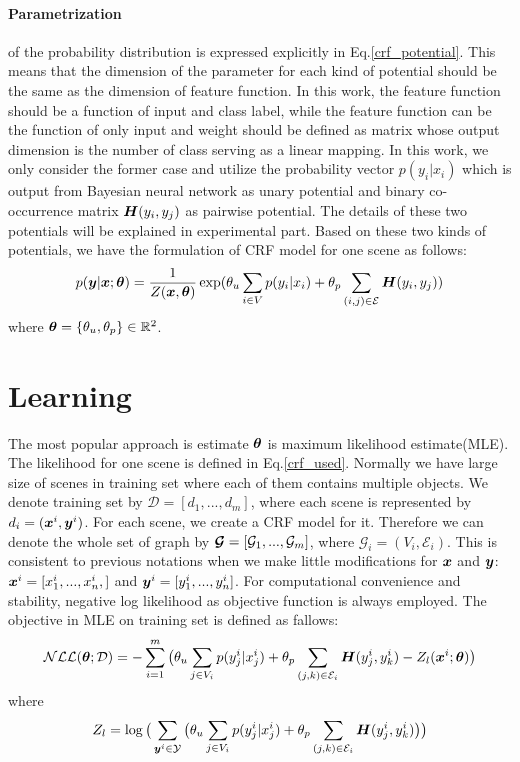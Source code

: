 \paragraph{Parametrization} of the probability distribution is expressed explicitly in Eq.\ref{crf_potential}. This means that the dimension of the parameter for each kind of potential should be the same as the dimension of feature function. In this work, the feature function should be a function of input and class label, while the feature function can be the function of only input and weight should be defined as matrix whose output dimension is the number of class serving as a linear mapping. In this work, we only consider the former case and utilize the probability vector $p(y_i|x_i)$ which is output from Bayesian neural network as unary potential and binary co-occurrence matrix $\boldsymbol H(y_i,y_j)$ as pairwise potential. The details of these two potentials will be explained in experimental part. Based on these two kinds of potentials, we have the formulation of CRF model for one scene as follows:
\begin{equation}
\label{crf_used}
p(\boldsymbol y|\boldsymbol x; \boldsymbol \theta) = \frac{1}{Z(\boldsymbol x, \boldsymbol \theta)}\exp(\theta_u\sum_{i\in V}p(y_i|x_i) + \theta_p\sum_{(i,j)\in \mathcal{E}}\boldsymbol H(y_i,y_j))
\end{equation}
where $\boldsymbol \theta = \{\theta_u, \theta_p\} \in \mathbb{R}^2$.

\section{Learning}
The most popular approach is estimate $\boldsymbol \theta$ is maximum likelihood estimate(MLE). The likelihood for one scene is defined in Eq.\ref{crf_used}. Normally we have large size of scenes in training set where each of them contains multiple objects. We denote training set by $\mathcal{D} = [d_1, ..., d_m]$, where each scene is represented by $d_i = (\boldsymbol x^i, \boldsymbol y^i)$. For each scene, we create a CRF model for it. Therefore we can denote the whole set of graph by $\boldsymbol{\mathcal{G}}=[\mathcal{G}_1, ..., \mathcal{G}_m]$, where $\mathcal{G}_i = (V_i, \mathcal{E}_i)$. This is consistent to previous notations when we make little modifications for $\boldsymbol x$ and $\boldsymbol y$: $\boldsymbol x^i = [x^i_1, ..., x^i_n,]$ and $\boldsymbol y^i = [y^i_1, ..., y^i_n]$. For computational convenience and stability, negative log likelihood as objective function is always employed. The objective in MLE on training set is defined as fallows:
\begin{equation}
\label{crf_obj}
\mathcal{NLL}(\boldsymbol \theta; \mathcal{D}) = -\sum_{i=1}^{m}\big(\theta_u\sum_{j\in V_i} p(y_j^i|x_j^i) + \theta_p\sum_{(j,k)\in\mathcal{E}_i}\boldsymbol H(y_j^i, y_k^i)  - Z_l(\boldsymbol x^i; \boldsymbol \theta)\big)
\end{equation}     
where 
\begin{equation}
\label{log_partition_func}
Z_l = \log
\big(
\sum_{\boldsymbol y^i \in \mathcal{Y}} 
\big( 
\theta_u\sum_{j\in V_i}p(y_j^i|x_j^i) + \theta_p\sum_{(j,k)\in \mathcal{E}_i}\boldsymbol H(y_j^i, y_k^i) 
\big) 
\big)
\end{equation}

